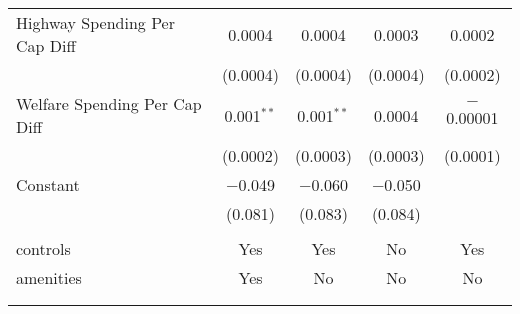 \begin{table}[!htbp]
\begin{tabular}{@{\extracolsep{5pt}}lcccc}
  Highway Spending Per Cap Diff & 0.0004 & 0.0004 & 0.0003 & 0.0002 \\ 
  & (0.0004) & (0.0004) & (0.0004) & (0.0002) \\ 
  Welfare Spending Per Cap Diff & 0.001$^{**}$ & 0.001$^{**}$ & 0.0004 & $-$0.00001 \\ 
  & (0.0002) & (0.0003) & (0.0003) & (0.0001) \\ 
  Constant & $-$0.049 & $-$0.060 & $-$0.050 &  \\ 
  & (0.081) & (0.083) & (0.084) &  \\ 
 \hline \\[-1.8ex] 
controls & Yes & Yes & No & Yes \\ 
amenities & Yes & No & No & No \\ 
\hline \\[-1.8ex] 
\hline 
\hline \\[-1.8ex] 
\end{tabular} 
\end{table} 
